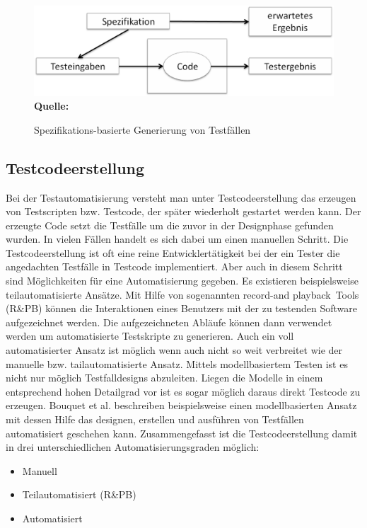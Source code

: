\begin{figure}[htb]
  \centering  
  \includegraphics[scale=0.6]{img/specBasedDesign.png}\\
  \footnotesize\sffamily\textbf{Quelle:} \cite[vgl. S. 21]{fewster_software_1999}
  \caption{Spezifikations-basierte Generierung von Testfällen}
  \label{fig:specBasedDesign}
\end{figure}

\subsection{Testcodeerstellung}
\label{subsec:testcodeerstellung}
Bei der Testautomatisierung versteht man unter Testcodeerstellung das erzeugen von Testscripten bzw. Testcode, der später wiederholt gestartet werden kann. Der erzeugte Code setzt die Testfälle um die zuvor in der Designphase gefunden wurden.
In vielen Fällen handelt es sich dabei um einen manuellen Schritt. Die Testcodeerstellung ist oft eine reine Entwicklertätigkeit bei der ein Tester die angedachten Testfälle in Testcode implementiert.
Aber auch in diesem Schritt sind Möglichkeiten für eine Automatisierung gegeben.
Es existieren beispielsweise teilautomatisierte Ansätze. Mit Hilfe von sogenannten \grq record-and playback\grq\ Tools (R\&PB) können die Interaktionen eines Benutzers mit der zu testenden Software aufgezeichnet werden. Die aufgezeichneten Abläufe können dann verwendet werden um automatisierte Testskripte zu generieren.
Auch ein voll automatisierter Ansatz ist möglich wenn auch nicht so weit verbreitet wie der manuelle bzw. tailautomatisierte Ansatz.
Mittels modellbasiertem Testen ist es nicht nur möglich Testfalldesigns abzuleiten. Liegen die Modelle in einem entsprechend hohen Detailgrad vor ist es sogar möglich daraus direkt Testcode zu erzeugen. Bouquet et al. \cite{bouquet_test_2008} beschreiben beispielsweise einen modellbasierten Ansatz mit dessen Hilfe das designen, erstellen und ausführen von Testfällen automatisiert geschehen kann. \cite{amannejad_search-based_2014}
Zusammengefasst ist die Testcodeerstellung damit in drei unterschiedlichen Automatisierungsgraden möglich:
\begin{itemize}
\item Manuell
\item Teilautomatisiert (R\&PB)
\item Automatisiert
\end{itemize}

